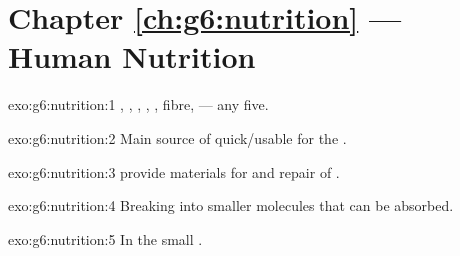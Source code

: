 \section*{Chapter \ref{ch:g6:nutrition} --- Human Nutrition}

\begin{solution}{exo:g6:nutrition:1}
, , , , , fibre,  --- any
five.
\end{solution}

\begin{solution}{exo:g6:nutrition:2}
Main source of quick/usable  for the .
\end{solution}

\begin{solution}{exo:g6:nutrition:3}
 provide materials for  and repair of .
\end{solution}

\begin{solution}{exo:g6:nutrition:4}
Breaking  into smaller molecules that can be absorbed.
\end{solution}

\begin{solution}{exo:g6:nutrition:5}
In the small .
\end{solution}

